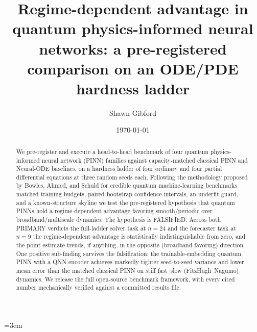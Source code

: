 \documentclass[%
  prx,
  twocolumn,
  amsmath,
  amssymb,
  aps,
  reprint,
  superscriptaddress,
  floatfix,
]{revtex4-2}
\newcommand{\fhn}{FitzHugh--Nagumo}
\begin{document}
\sloppy
\emergencystretch=3em

\title{%
  Regime-dependent advantage in quantum physics-informed neural
  networks: a pre-registered comparison on an ODE/PDE hardness
  ladder%
}

\author{Shawn Gibford}

\date{\today}

\begin{abstract}
We pre-register and execute a head-to-head benchmark of four quantum
physics-informed neural network (PINN) families against
capacity-matched classical PINN and Neural-ODE baselines, on a
hardness ladder of four ordinary and four partial differential
equations at three random seeds each. Following the methodology
proposed by Bowles, Ahmed, and Schuld for credible quantum
machine-learning benchmarks \textemdash{} matched training budgets,
paired-bootstrap confidence intervals, an underfit guard, and a
known-structure skyline \textemdash{} we test the pre-registered
hypothesis that quantum PINNs hold a regime-dependent advantage
favoring smooth/periodic over broadband/multiscale dynamics. The
hypothesis is FALSIFIED. Across both PRIMARY verdicts \textemdash{} the
full-ladder solver task at $n=24$ and the forecaster task at $n=9$
\textemdash{} the regime-dependent advantage is statistically
indistinguishable from zero, and the point estimate trends, if
anything, in the opposite (broadband-favoring) direction. One positive
sub-finding survives the falsification: the trainable-embedding quantum
PINN with a QNN encoder achieves markedly tighter seed-to-seed variance
and lower mean error than the matched classical PINN on stiff
fast--slow (\fhn{}) dynamics. We release the full open-source benchmark
framework, with every cited number mechanically verified against a
committed results file.
\end{abstract}

\maketitle
\end{document}
